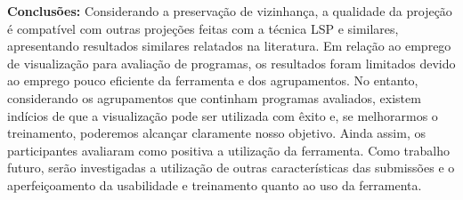 \begin{resumo}
\textbf{Conclusões:} 
Considerando a preservação de vizinhança, a qualidade da projeção é compatível
com outras projeções feitas com a técnica LSP e similares, apresentando resultados
similares relatados na literatura. Em relação ao emprego de visualização para
avaliação de programas, os resultados foram limitados devido ao emprego pouco
eficiente da ferramenta e dos agrupamentos. No entanto, considerando os agrupamentos
que continham programas avaliados, existem indícios de que a visualização pode
ser utilizada com êxito e, se melhorarmos o treinamento, poderemos alcançar
claramente nosso objetivo. Ainda assim, os participantes avaliaram como positiva
a utilização da ferramenta. Como trabalho futuro, serão investigadas a utilização
de outras características das submissões e o aperfeiçoamento da usabilidade e
treinamento quanto ao uso da ferramenta.

\vspace{.3cm}
\end{resumo}



